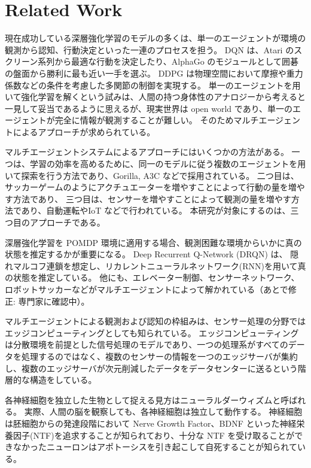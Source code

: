 \section{Related Work}
現在成功している深層強化学習のモデルの多くは、単一のエージェントが環境の観測から認知、行動決定といった一連のプロセスを担う。
DQN \citep{mnih2015human,silver2016mastering} は、Atari のスクリーン系列から最適な行動を決定したり、AlphaGo のモジュールとして囲碁の盤面から勝利に最も近い一手を選ぶ。
DDPG \citep{lillicrap2015continuous} は物理空間において摩擦や重力係数などの条件を考慮した多関節の制御を実現する。
単一のエージェントを用いて強化学習を解くという試みは、人間の持つ身体性のアナロジーから考えると一見して妥当であるように思えるが、現実世界は open world であり、単一のエージェントが完全に情報が観測することが難しい。
そのためマルチエージェントによるアプローチが求められている。

マルチエージェントシステムによるアプローチにはいくつかの方法がある。
一つは、学習の効率を高めるために、同一のモデルに従う複数のエージェントを用いて探索を行う方法であり、Gorilla, A3C \citep{mnih2016asynchronous} などで採用されている。
二つ目は、サッカーゲームのようにアクチュエーターを増やすことによって行動の量を増やす方法であり、
三つ目は、センサーを増やすことによって観測の量を増やす方法であり、自動運転やIoT などで行われている。
本研究が対象にするのは、三つ目のアプローチである。

深層強化学習を POMDP 環境に適用する場合、観測困難な環境からいかに真の状態を推定するかが重要になる。
Deep Recurrent Q-Network (DRQN) \citep{sorokin2015deep} は、
隠れマルコフ連鎖を想定し、リカレントニューラルネットワーク(RNN)を用いて真の状態を推定している。
他にも、エレベーター制御\citep{crites1998elevator}、センサーネットワーク\citep{fox2000probabilistic}、ロボットサッカー\citep{stone1998towards}などがマルチエージェントによって解かれている（あとで修正: 専門家に確認中）。

マルチエージェントによる観測および認知の枠組みは、センサー処理の分野ではエッジコンピューティング\citep{bonomi2012fog}としても知られている。
エッジコンピューティングは分散環境を前提とした信号処理のモデルであり、一つの処理系がすべてのデータを処理するのではなく、複数のセンサーの情報を一つのエッジサーバが集約し、複数のエッジサーバが次元削減したデータをデータセンターに送るという階層的な構造をしている。


各神経細胞を独立した生物として捉える見方はニューラルダーウィズム\citep{edelman1987neural}と呼ばれる。
実際、人間の脳を観察しても、各神経細胞は独立して動作する。
神経細胞は胚細胞からの発達段階において Nerve Growth Factor、BDNF といった神経栄養因子(NTF)を追求することが知られており、十分な NTF を受け取ることができなかったニューロンはアポトーシスを引き起こして自死することが知られている\citep{almeida2005neuroprotection}。

